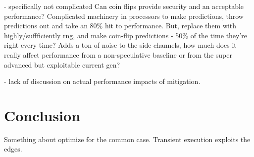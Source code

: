 \documentclass[11pt,conference]{IEEEtran}
\begin{document}
- specifically not complicated
Can coin flips provide security and an acceptable performance?
Complicated machinery in processors to make predictions, throw predictions out and take an 80\% hit to performance.
But, replace them with highly/suffficiently rng, and make coin-flip predictions - 50\% of the time they're right every time?
Adds a ton of noise to the side channels, how much does it really affect performance from a non-speculative baseline or from the super advanced but exploitable current gen?

- lack of discussion on actual performance impacts of mitigation.

\section{Conclusion}

Something about optimize for the common case.
Transient execution exploits the edges.




\end{document}
